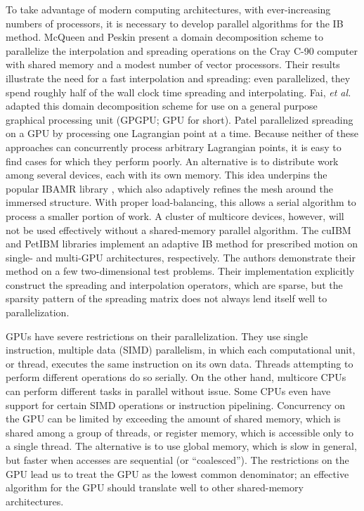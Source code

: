 To take advantage of modern computing architectures, with ever-increasing numbers of
processors, it is necessary to develop parallel algorithms for the IB method.
McQueen and Peskin \cite{McQueen:1997kw} present a domain decomposition scheme to
parallelize the interpolation and spreading operations on the Cray C-90 computer with
shared memory and a modest number of vector processors. Their results illustrate the need
for a fast interpolation and spreading: even parallelized, they spend roughly half of the
wall clock time spreading and interpolating. Fai, \textit{et al.} \cite{Fai:2013do}
adapted this domain decomposition scheme for use on a general purpose graphical
processing unit (GPGPU; GPU for short). Patel \cite{Patel:2012tc} parallelized spreading
on a GPU by processing one Lagrangian point at a time. Because neither of these
approaches can concurrently process arbitrary Lagrangian points, it is easy to find cases
for which they perform poorly. An alternative is to distribute work among several
devices, each with its own memory. This idea underpins the popular IBAMR library
\cite{Griffith:2007uk,Griffith:2007do,Griffith:2009gg, Griffith:2011gi, Griffith:2017id},
which also adaptively refines the mesh around the immersed structure. With proper
load-balancing, this allows a serial algorithm to process a smaller portion of work.
A cluster of multicore devices, however, will not be used effectively without a
shared-memory parallel algorithm. The cuIBM \cite{Layton:2011um} and PetIBM
\cite{Mesnard:2017te,Chuang:2018ej} libraries implement an adaptive IB method for
prescribed motion on single- and multi-GPU architectures, respectively. The authors
demonstrate their method on a few two-dimensional test problems. Their implementation
explicitly construct the spreading and interpolation operators, which are sparse, but the
sparsity pattern of the spreading matrix does not always lend itself well to
parallelization.

GPUs have severe restrictions on their parallelization. They use single instruction,
multiple data (SIMD) parallelism, in which each computational unit, or thread, executes
the same instruction on its own data. Threads attempting to perform different operations
do so serially. On the other hand, multicore CPUs can perform different tasks in parallel
without issue. Some CPUs even have support for certain SIMD operations or instruction
pipelining. Concurrency on the GPU can be limited by exceeding the amount of shared
memory, which is shared among a group of threads, or register memory, which is accessible
only to a single thread. The alternative is to use global memory, which is slow in
general, but faster when accesses are sequential (or ``coalesced''). The restrictions on
the GPU lead us to treat the GPU as the lowest common denominator; an effective algorithm
for the GPU should translate well to other shared-memory architectures.

